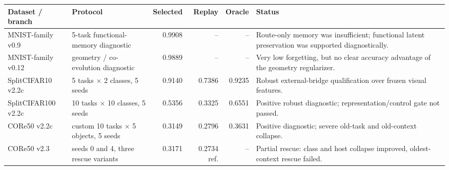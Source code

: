 \begin{tabularx}{\linewidth}{@{}l l r r r X@{}}
\toprule
Dataset / branch & Protocol & Selected & Replay & Oracle & Status \\
\midrule
MNIST-family v0.9 & 5-task functional-memory diagnostic & 0.9908 & -- & -- & Route-only memory was insufficient; functional latent preservation was supported diagnostically. \\
MNIST-family v0.12 & geometry / co-evolution diagnostic & 0.9889 & -- & -- & Very low forgetting, but no clear accuracy advantage of the geometry regularizer. \\
SplitCIFAR10 v2.2c & 5 tasks $\times$ 2 classes, 5 seeds & 0.9140 & 0.7386 & 0.9235 & Robust external-bridge qualification over frozen visual features. \\
SplitCIFAR100 v2.2c & 10 tasks $\times$ 10 classes, 5 seeds & 0.5356 & 0.3325 & 0.6551 & Positive robust diagnostic; representation/control gate not passed. \\
CORe50 v2.2c & custom 10 tasks $\times$ 5 objects, 5 seeds & 0.3149 & 0.2796 & 0.3631 & Positive diagnostic; severe old-task and old-context collapse. \\
CORe50 v2.3 & seeds 0 and 4, three rescue variants & 0.3171 & 0.2734 ref. & -- & Partial rescue: class and host collapse improved, oldest-context rescue failed. \\
\bottomrule
\end{tabularx}
